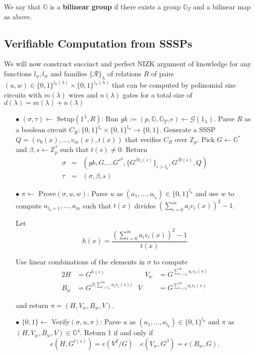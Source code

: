 \documentclass[lnbip]{svmultln}
\begin{document}
We say that $\mathbb{G}$ is a \textbf{bilinear group} if there exists a group $\mathbb{G}_T$ and a bilinear
map as above.

\subsection{Verifiable Computation from SSSPs}
We will now construct succinct and perfect NIZK argument of knowledge for any functions $l_u, l_w$ and families $\{\mathcal{R}\}_\lambda$ of relations $R$ of pairs $(u,w) \in \{0,1\}^{l_u(\lambda)} \times \{0,1\}^{l_w(\lambda)} $ that can be computed by polinomial size circuits with $m(\lambda)$ wires and $n(\lambda)$ gates for a total size of $d(\lambda)=m(\lambda)+n(\lambda)$ \\

\begin{itemize}
\item[$\bullet$] $(\sigma,\tau) \leftarrow$ Setup$(1^\lambda,R)$: Run $gk := (p,\mathbb{G},\mathbb{G}_T,e) \leftarrow \mathcal{G}(1_\lambda)$. Parse $R$ as a boolean circuit $C_R:\{0,1\}^{l_u}\times \{0,1\}^{l_w} \rightarrow \{0,1\}$. Generate a SSSP $Q = (v_0(x),...,v_m(x),t(x))$ that verifies $C_R$ over $\mathbb{Z}_p$. Pick $G \leftarrow \mathbb{G}^*$ and $\beta,s \leftarrow \mathbb{Z}_p^*$ such that $t(s) \neq 0$. Return
\begin{eqnarray*}
  \sigma &=& (gk,G,...G^{s^d},\{G^{\beta v_i(s)}\}_{i>l_u},G^{\beta t(s)},Q)\\
  \tau &=& (\sigma,\beta,s)
\end{eqnarray*}

\item[$\bullet$] $\pi \leftarrow$ Prove$(\sigma, u,w)$: Parse $u$ as $(a_1,...,a_{l_u}) \in \{0,1\}^{l_u}$ and use $w$ to compute $a_{l_u+1},...,a_m$ such that $t(x)$ divides $\left(\sum\limits_{i=0}^ma_i v_i(x)\right)^2-1$.

Let 
$$h(x) = \frac{\left(\sum\limits_{i=0}^ma_i v_i(x)\right)^2-1}{t(x)}$$

Use linear combinations of the elements in $\sigma$ to compute
\begin{alignat*}{2}
 H &= G^{h(s)}  &\quad V_w &= G^{\sum\limits_{i>l_u}^m a_iv_v(s)} \\  
 B_w &= G^{\beta\big(\sum\limits_{i>l_u}^m a_iv_i(s)\big)} & 
 V &= G^{\sum\limits_{i=0}^m a_iv_i(s)}
\end{alignat*}

and return $\pi=(H,V_w,B_w,V)$.\\

\item[$\bullet$] $\{0,1\} \leftarrow$ Verify$(\sigma,u,\pi)$: Parse $u$ as $(a_1,...,a_{l_u})\in \{0,1\}^{l_u}$ and $\pi$ as $(H,V_w,B_w,V) \in \mathbb{G}^4$. Return 1 if and only if
$$e(H,G ^{t(s)})=e(V^2/G) \quad e(V_w,G^\beta)=e(B_w,G).  $$
\end{itemize}
\end{document}
